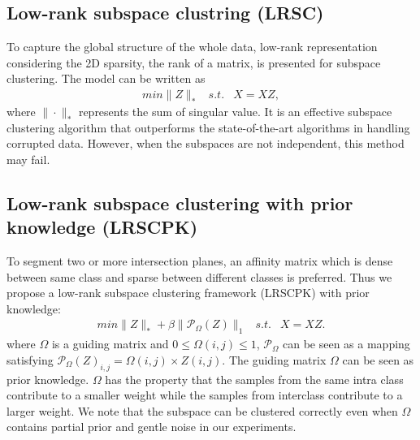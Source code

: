 \subsection{Low-rank subspace clustring (LRSC)}
\label{sec:LRSC}
To capture the global structure of
the whole data, low-rank representation~\cite{DBLP:journals/corr/abs-1010-2955,LiuLY10}
considering the 2D sparsity, \ie the rank of a matrix, is presented for subspace clustering.
The model can be written as
\begin{eqnarray}
min \|Z\|_{*} & s.t. & X=XZ,
\end{eqnarray}
where $\|\cdot\|_{*}$ represents the sum of singular value. It is an effective subspace clustering algorithm that outperforms the state-of-the-art algorithms in handling corrupted data. However, when the subspaces are not independent, this method may fail.


\subsection{Low-rank subspace clustering with prior knowledge (LRSCPK)}
\label{sec:LRSCPK}
To segment two or more intersection planes, an affinity matrix which is
dense between same class and sparse between different classes is preferred.
%
Thus we propose a low-rank subspace clustering framework (LRSCPK) with prior knowledge:
\begin{eqnarray}
min \|Z\|_{*} + \beta\|\mathcal {P}_{\Omega}(Z)\|_{1} & s.t. &
X=XZ.\label{eq:SSLRR}
\end{eqnarray}
where $\Omega$ is a guiding matrix and $0 \leq \Omega(i,j) \leq 1$,
$\mathcal {P}_{\Omega}$ can be seen as a mapping satisfying $\mathcal {P}_{\Omega}(Z)_{i,j} = \Omega(i,j)\times Z(i,j)$.
The guiding matrix $\Omega$ can be seen as prior knowledge. $\Omega$ has the property that the samples from the same
intra class contribute to a smaller weight while the samples from interclass contribute to a larger weight.
We note that the subspace can be clustered correctly even when $\Omega$ contains partial prior and gentle noise in our experiments.

